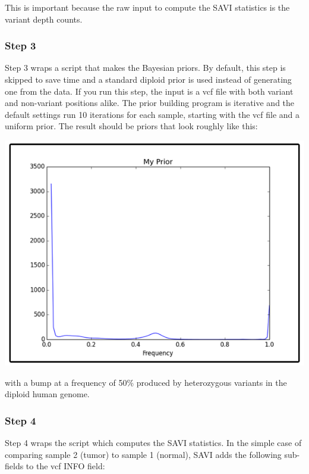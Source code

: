 \documentclass[letterpaper,14pt]{memoir}
\begin{document}
\noindent This is important because the raw input to compute the SAVI statistics is the variant depth counts.

\subsubsection{Step 3}

Step 3 wraps a script that makes the Bayesian priors.
By default, this step is skipped to save time and a standard diploid prior is used instead of generating one from the data.
If you run this step, the input is a vcf file with both variant and non-variant positions alike.
The prior building program is iterative and the default settings run 10 iterations for each sample, starting with the vcf file and a uniform prior. 
The result should be priors that look roughly like this: 

\begin{center}
\includegraphics[scale=0.75]{myprior_600.png}
\end{center}

\noindent with a bump at a frequency of 50\% produced by heterozygous variants in the diploid human genome.

\subsubsection{Step 4}

Step 4 wraps the script which computes the SAVI statistics.
In the simple case of comparing sample 2 (tumor) to sample 1 (normal), SAVI adds the following sub-fields to the vcf INFO field:
\end{document}
